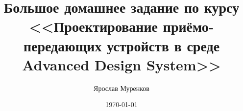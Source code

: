 \documentclass[a4paper,12pt]{report}
\author{Ярослав Муренков}
\title{Большое домашнее задание по курсу <<Проектирование приёмо-передающих устройств в среде Advanced Design System>>}
\date{\today}
\begin{document}

\tableofcontents{}








\end{document}
